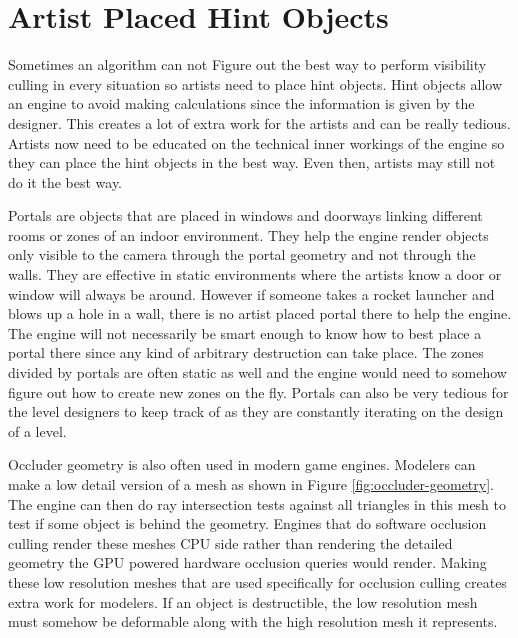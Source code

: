 \documentclass[12pt]{ucthesis}
\begin{document}
\section{Artist Placed Hint Objects}
\label{artist-placed-hint-objects}

Sometimes an algorithm can not Figure out the best way to perform visibility culling in every situation so artists need to place hint objects.
Hint objects allow an engine to avoid making calculations since the information is given by the designer.
This creates a lot of extra work for the artists and can be really tedious.
Artists now need to be educated on the technical inner workings of the engine so they can place the hint objects in the best way.
Even then, artists may still not do it the best way.

Portals are objects that are placed in windows and doorways linking different rooms or zones of an indoor environment.\cite{Vis-Computations-Densely-Occluded, Doom3-source-review, Portal-culling}
They help the engine render objects only visible to the camera through the portal geometry and not through the walls.
They are effective in static environments where the artists know a door or window will always be around.
However if someone takes a rocket launcher and blows up a hole in a wall, there is no artist placed portal there to help the engine.
The engine will not necessarily be smart enough to know how to best place a portal there since any kind of arbitrary destruction can take place.
The zones divided by portals are often static as well and the engine would need to somehow figure out how to create new zones on the fly.
Portals can also be very tedious for the level designers to keep track of as they are constantly iterating on the design of a level.

Occluder geometry is also often used in modern game engines.
Modelers can make a low detail version of a mesh as shown in Figure \ref{fig:occluder-geometry}.\cite{culling-bf}
The engine can then do ray intersection tests against all triangles in this mesh to test if some object is behind the geometry.\cite{Cryengine-culling-explained}
Engines that do software occlusion culling render these meshes CPU side rather than rendering the detailed geometry the GPU powered hardware occlusion queries would render.
Making these low resolution meshes that are used specifically for occlusion culling creates extra work for modelers.
If an object is destructible, the low resolution mesh must somehow be deformable along with the high resolution mesh it represents.
\end{document}
